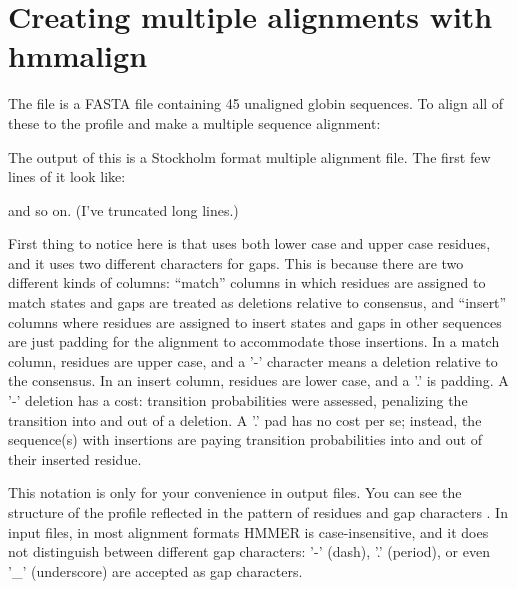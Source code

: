 \section{Creating multiple alignments with hmmalign}

The file  is a FASTA file containing 45
unaligned globin sequences. To align all of these to the
 profile and make a multiple sequence alignment:

   \vspace{1ex}
   \vspace{1ex}

The output of this is a Stockholm format multiple alignment file. The
first few lines of it look like:


and so on. (I've truncated long lines.)

First thing to notice here is that  uses both lower
case and upper case residues, and it uses two different characters for
gaps.  This is because there are two different kinds of columns:
``match'' columns in which residues are assigned to match states and
gaps are treated as deletions relative to consensus, and ``insert''
columns where residues are assigned to insert states and gaps in other
sequences are just padding for the alignment to accommodate those
insertions. In a match column, residues are upper case, and a '-'
character means a deletion relative to the consensus. In an insert
column, residues are lower case, and a '.' is padding.  A '-' deletion
has a cost: transition probabilities were assessed, penalizing the
transition into and out of a deletion. A '.' pad has no cost per se;
instead, the sequence(s) with insertions are paying transition
probabilities into and out of their inserted residue.

This notation is only for your convenience in output files. You can
see the structure of the profile reflected in the pattern of
residues and gap characters .  In input files, in
most alignment formats HMMER is
case-insensitive, and it does not distinguish between different gap
characters: '-' (dash), '.' (period), or even '\_' (underscore) are
accepted as gap characters.

